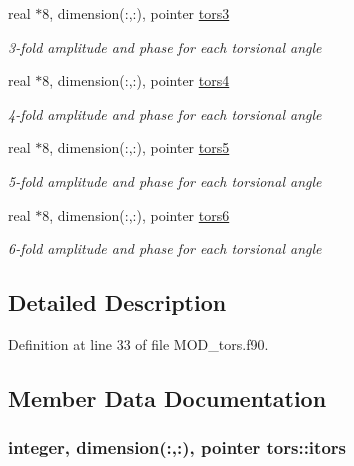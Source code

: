 \begin{DoxyCompactItemize}
real $\ast$8, dimension(\-:,\-:), pointer \hyperlink{classtors_a98589f236939f86f0aec2b1b1542dc9c}{tors3}
\begin{DoxyCompactList}\small\item\em 3-\/fold amplitude and phase for each torsional angle \end{DoxyCompactList}\item 
real $\ast$8, dimension(\-:,\-:), pointer \hyperlink{classtors_a664bbbab92d62df9a1d67b1e47a467d0}{tors4}
\begin{DoxyCompactList}\small\item\em 4-\/fold amplitude and phase for each torsional angle \end{DoxyCompactList}\item 
real $\ast$8, dimension(\-:,\-:), pointer \hyperlink{classtors_a021bb0ab8d8f43957a38462ce7ce95fb}{tors5}
\begin{DoxyCompactList}\small\item\em 5-\/fold amplitude and phase for each torsional angle \end{DoxyCompactList}\item 
real $\ast$8, dimension(\-:,\-:), pointer \hyperlink{classtors_a814ae2dad20ccab069451bd283eedcf9}{tors6}
\begin{DoxyCompactList}\small\item\em 6-\/fold amplitude and phase for each torsional angle \end{DoxyCompactList}\end{DoxyCompactItemize}


\subsection{Detailed Description}


Definition at line 33 of file M\-O\-D\-\_\-tors.\-f90.



\subsection{Member Data Documentation}
\hypertarget{classtors_a603c1a2d6e0a48c34c461c682ccbf2b4}{
\subsubsection[{itors}]{\setlength{\rightskip}{0pt plus 5cm}integer, dimension(\-:,\-:), pointer tors\-::itors}}\label{classtors_a603c1a2d6e0a48c34c461c682ccbf2b4}


